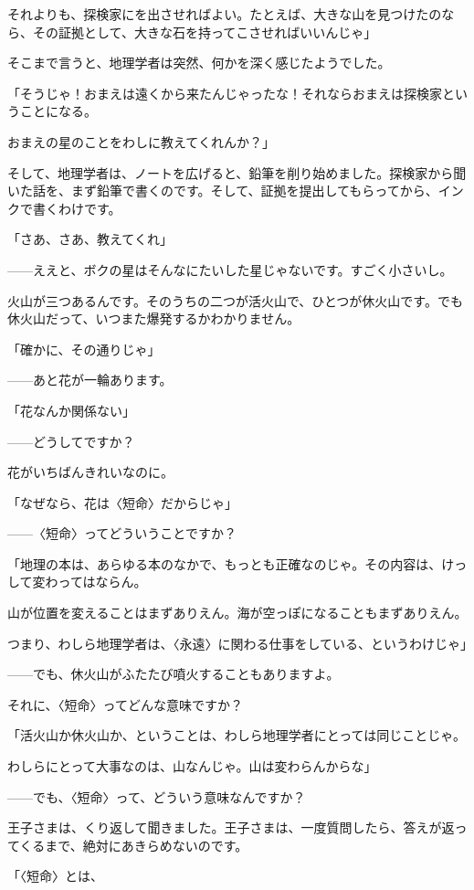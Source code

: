 それよりも、探検家にを出させればよい。たとえば、大きな山を見つけたのなら、その証拠として、大きな石を持ってこさせればいいんじゃ」

そこまで言うと、地理学者は突然、何かを深く感じたようでした。

「そうじゃ！おまえは遠くから来たんじゃったな！それならおまえは探検家ということになる。

おまえの星のことをわしに教えてくれんか？」

そして、地理学者は、ノートを広げると、鉛筆を削り始めました。探検家から聞いた話を、まず鉛筆で書くのです。そして、証拠を提出してもらってから、インクで書くわけです。

「さあ、さあ、教えてくれ」

——ええと、ボクの星はそんなにたいした星じゃないです。すごく小さいし。

火山が三つあるんです。そのうちの二つが活火山で、ひとつが休火山です。でも休火山だって、いつまた爆発するかわかりません。

「確かに、その通りじゃ」


——あと花が一輪あります。

「花なんか関係ない」

——どうしてですか？

花がいちばんきれいなのに。

「なぜなら、花は〈短命〉だからじゃ」

——〈短命〉ってどういうことですか？

「地理の本は、あらゆる本のなかで、もっとも正確なのじゃ。その内容は、けっして変わってはならん。

山が位置を変えることはまずありえん。海が空っぽになることもまずありえん。

つまり、わしら地理学者は、〈永遠〉に関わる仕事をしている、というわけじゃ」

——でも、休火山がふたたび噴火することもありますよ。

それに、〈短命〉ってどんな意味ですか？

「活火山か休火山か、ということは、わしら地理学者にとっては同じことじゃ。

わしらにとって大事なのは、山なんじゃ。山は変わらんからな」

——でも、〈短命〉って、どういう意味なんですか？

王子さまは、くり返して聞きました。王子さまは、一度質問したら、答えが返ってくるまで、絶対にあきらめないのです。

「〈短命〉とは、


